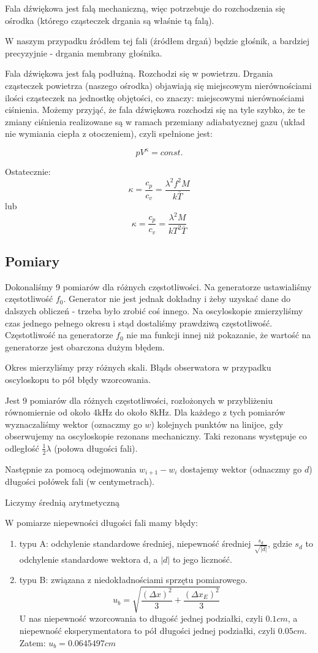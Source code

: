 \documentclass[12pt,a4paper]{article}
\begin{document}
Fala dźwiękowa jest falą mechaniczną, więc potrzebuje do rozchodzenia się ośrodka (którego cząsteczek drgania są właśnie tą falą).  

W naszym przypadku źródłem tej fali (źródłem drgań) będzie głośnik, a bardziej precyzyjnie - drgania membrany głośnika. 

Fala dźwiękowa jest falą podłużną. Rozchodzi się w powietrzu. Drgania cząsteczek powietrza (naszego ośrodka) objawiają się miejscowym nierównościami ilości cząsteczek na jednostkę objętości, co znaczy: miejscowymi nierównościami ciśnienia.
Możemy przyjąć, że fala dźwiękowa rozchodzi się na tyle szybko, że te zmiany ciśnienia realizowane są w ramach przemiany adiabatycznej gazu (układ nie wymiania ciepła z otoczeniem), czyli spełnione jest: 

$$
pV^\kappa = const.
$$


Ostatecznie:
$$
\kappa = \frac{c_p}{c_v} = \frac{\lambda^2 f^2 M}{k\bar{T}}
$$
lub
$$
\kappa = \frac{c_p}{c_v} = \frac{\lambda^2 M}{k T^2 \bar{T}}
$$


\subsection{Pomiary}
Dokonaliśmy 9 pomiarów dla różnych częstotliwości. Na generatorze ustawialiśmy częstotliwość $f_0$. Generator nie jest jednak dokładny i żeby uzyskać dane do dalszych obliczeń - trzeba było zrobić coś innego. Na oscyloskopie zmierzyliśmy czas jednego pełnego okresu i stąd dostaliśmy prawdziwą częstotliwość. Częstotliwość na generatorze $f_0$ nie ma funkcji innej niż pokazanie, że wartość na generatorze jest obarczona dużym błędem. 

Okres mierzyliśmy przy różnych skali. Błąds obserwatora w przypadku oscyloskopu to pół błędy wzorcowania.

Jest 9 pomiarów dla różnych częstotliwości, rozłożonych w przybliżeniu równomiernie od około 4kHz do około 8kHz. 
Dla każdego z tych pomiarów wyznaczaliśmy wektor (oznaczmy go $w$) kolejnych punktów na linijce, gdy obserwujemy na oscyloskopie rezonans mechaniczny. Taki rezonans występuje co odległość $\frac{1}{2}\lambda$ (połowa długości fali). 

Następnie za pomocą odejmowania $w_{i+1}-w_i$  dostajemy wektor (odnaczmy go $d$) długości połówek fali (w centymetrach). 

Liczymy średnią arytmetyczną 

W pomiarze niepewności długości fali mamy błędy:
\begin{enumerate}
\item  typu A: odchylenie standardowe średniej, niepewność średniej $\frac{s_d}{\sqrt{|d|}}$, gdzie $s_d$ to odchylenie standardowe wektora d, a $|d|$ to jego liczność. 
\item typu B: związana z niedokładnościami sprzętu pomiarowego. $$u_b = \sqrt{\frac{(\Delta x)^2}{3} + \frac{(\Delta x_E)^2}{3}}$$
U nas niepewność wzorcowania to długość jednej podziałki, czyli $0.1 cm$, a niepewność eksperymentatora to pół długości jednej podziałki, czyli $0.05 cm$.
Zatem: $u_b = 0.0645497cm $
\end{enumerate} 
\end{document}
